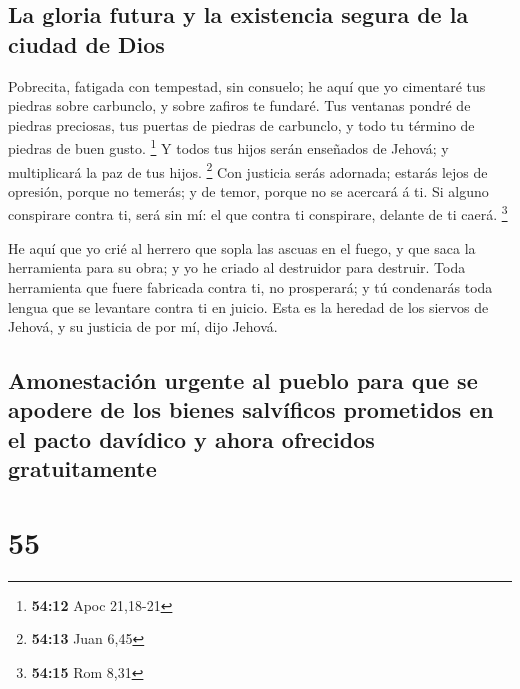 \hypertarget{la-gloria-futura-y-la-existencia-segura-de-la-ciudad-de-dios}{%
\subsection{La gloria futura y la existencia segura de la ciudad de
Dios}\label{la-gloria-futura-y-la-existencia-segura-de-la-ciudad-de-dios}}

 Pobrecita, fatigada con tempestad, sin consuelo; he aquí
que yo cimentaré tus piedras sobre carbunclo, y sobre zafiros te
fundaré.  Tus ventanas pondré de piedras preciosas, tus
puertas de piedras de carbunclo, y todo tu término de piedras de buen
gusto. \footnote{\textbf{54:12} Apoc 21,18-21}  Y todos tus
hijos serán enseñados de Jehová; y multiplicará la paz de tus hijos.
\footnote{\textbf{54:13} Juan 6,45}  Con justicia serás
adornada; estarás lejos de opresión, porque no temerás; y de temor,
porque no se acercará á ti.  Si alguno conspirare contra
ti, será sin mí: el que contra ti conspirare, delante de ti caerá.
\footnote{\textbf{54:15} Rom 8,31}

 He aquí que yo crié al herrero que sopla las ascuas en el
fuego, y que saca la herramienta para su obra; y yo he criado al
destruidor para destruir.  Toda herramienta que fuere
fabricada contra ti, no prosperará; y tú condenarás toda lengua que se
levantare contra ti en juicio. Esta es la heredad de los siervos de
Jehová, y su justicia de por mí, dijo Jehová.

\hypertarget{amonestaciuxf3n-urgente-al-pueblo-para-que-se-apodere-de-los-bienes-salvuxedficos-prometidos-en-el-pacto-davuxeddico-y-ahora-ofrecidos-gratuitamente}{%
\subsection{Amonestación urgente al pueblo para que se apodere de los
bienes salvíficos prometidos en el pacto davídico y ahora ofrecidos
gratuitamente}\label{amonestaciuxf3n-urgente-al-pueblo-para-que-se-apodere-de-los-bienes-salvuxedficos-prometidos-en-el-pacto-davuxeddico-y-ahora-ofrecidos-gratuitamente}}

\hypertarget{section-54}{%
\section{55}\label{section-54}}

